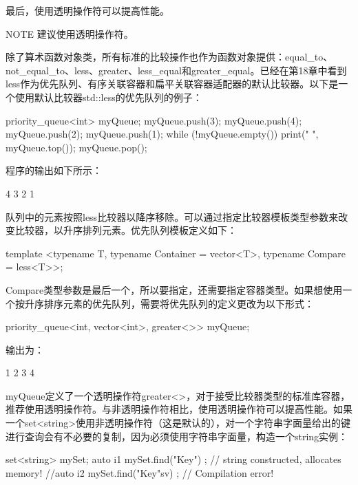 最后，使用透明操作符可以提高性能。

\begin{myNotic}{NOTE}
建议使用透明操作符。
\end{myNotic}


除了算术函数对象类，所有标准的比较操作也作为函数对象提供：equal\_to、not\_equal\_to、less、greater、less\_equal和greater\_equal。已经在第18章中看到less作为优先队列、有序关联容器和扁平关联容器适配器的默认比较器。以下是一个使用默认比较器std::less的优先队列的例子：

\begin{cpp}
priority_queue<int> myQueue;
myQueue.push(3);
myQueue.push(4);
myQueue.push(2);
myQueue.push(1);
while (!myQueue.empty()) {
    print("{} ", myQueue.top());
    myQueue.pop();
}
\end{cpp}

程序的输出如下所示：

\begin{shell}
4 3 2 1
\end{shell}

队列中的元素按照less比较器以降序移除。可以通过指定比较器模板类型参数来改变比较器，以升序排列元素。优先队列模板定义如下：

\begin{cpp}
template <typename T, typename Container = vector<T>, typename Compare = less<T>>;
\end{cpp}

Compare类型参数是最后一个，所以要指定，还需要指定容器类型。如果想使用一个按升序排序元素的优先队列，需要将优先队列的定义更改为以下形式：

\begin{cpp}
priority_queue<int, vector<int>, greater<>> myQueue;
\end{cpp}

输出为：

\begin{shell}
1 2 3 4
\end{shell}

myQueue定义了一个透明操作符greater<>，对于接受比较器类型的标准库容器，推荐使用透明操作符。与非透明操作符相比，使用透明操作符可以提高性能。如果一个set<string>使用非透明操作符（这是默认的），对一个字符串字面量给出的键进行查询会有不必要的复制，因为必须使用字符串字面量，构造一个string实例：

\begin{cpp}
set<string> mySet;
auto i1 { mySet.find("Key") }; // string constructed, allocates memory!
//auto i2 { mySet.find("Key"sv) }; // Compilation error!
\end{cpp}

